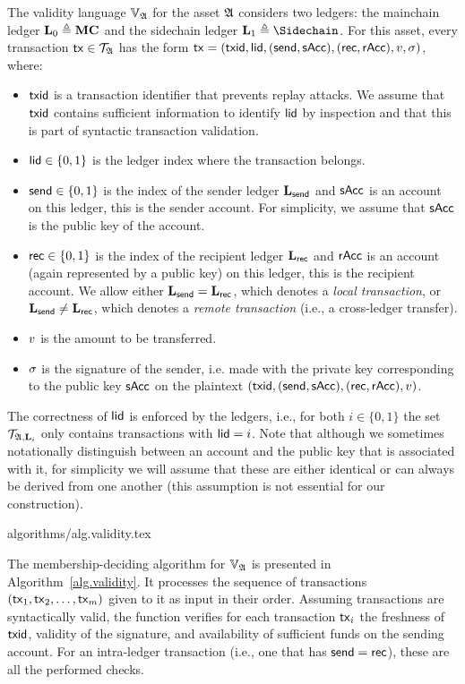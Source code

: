 The validity language $\mathbb{V}_{\mathfrak{A}}$ for the asset $\mathfrak{A}$ considers
two ledgers: the mainchain ledger $\mathbf{L}_0\triangleq\mathbf{MC}$ and the sidechain ledger
$\Ledger_1\defeq\Sidechain$. For this asset, every transaction $\mathsf{tx}\in\mathcal{T}_{\mathfrak{A}}$ has the form
$
\mathsf{tx}=\left(
  \mathsf{txid},
  \mathsf{lid},
  (\mathsf{send}, \mathsf{sAcc}),
  (\mathsf{rec}, \mathsf{rAcc}),
  v,
  \sigma
\right)
$,
where:
\begin{itemize}
  \item $\mathsf{txid}$ is a transaction identifier that prevents replay attacks.
    We assume that
    $\mathsf{txid}$ contains sufficient information to identify $\mathsf{lid}$ by inspection
    and that this is part of syntactic transaction validation.
  \item $\mathsf{lid} \in \{0, 1\}$ is the ledger index where the transaction belongs.
  \item $\mathsf{send} \in \{0, 1\}$ is the index of the sender ledger $\mathbf{L}_{\mathsf{send}}$ and
    $\mathsf{sAcc}$ is an account  on this ledger,
    this is the sender account. For simplicity, we assume that $\mathsf{sAcc}$ is
    the public key of the account.
  \item $\mathsf{rec} \in \{0, 1\}$ is the index of the recipient ledger $\mathbf{L}_{\mathsf{rec}}$ and
    $\mathsf{rAcc}$ is an account (again represented by a public key) on this
    ledger, this is the recipient account.
    We allow either $\mathbf{L}_{\mathsf{send}}=\mathbf{L}_{\mathsf{rec}}$, which denotes a \emph{local
    transaction}, or $\mathbf{L}_{\mathsf{send}}\neq\mathbf{L}_{\mathsf{rec}}$, which denotes a
    \emph{remote transaction} (i.e., a cross-ledger transfer).
\item $v$ is the amount to be transferred.
\item $\sigma$ is the signature of the sender, i.e. made with the private key
      corresponding to the public key $\mathsf{sAcc}$ on the plaintext
      $(\mathsf{txid}, (\mathsf{send}, \mathsf{sAcc}), (\mathsf{rec}, \mathsf{rAcc}), v)$.
\end{itemize}
The correctness of $\mathsf{lid}$ is enforced by the ledgers, i.e., for
both $i\in\{0,1\}$ the set $\mathcal{T}_{\mathfrak{A},\mathbf{L}_i}$ only contains transactions
with $\mathsf{lid}=i$.
Note that although we sometimes notationally distinguish between an account and the
public key that is associated with it, for simplicity we will assume that these
are either identical or can always be derived from one another (this assumption is not
essential for our construction).

{algorithms/alg.validity.tex}

The membership-deciding algorithm for $\mathbb{V}_{\mathfrak{A}}$
is presented in Algorithm~\ref{alg.validity}.
It
processes the sequence of transactions $(\mathsf{tx}_1, \mathsf{tx}_2, \dots,
\mathsf{tx}_m)$ given to it as input in their order. Assuming transactions are
syntactically valid, the function verifies for each transaction $\mathsf{tx}_i$ the
freshness of $\mathsf{txid}$, validity of the signature, and availability of sufficient
funds on the sending account. For an intra-ledger transaction (i.e., one that
has $\mathsf{send}=\mathsf{rec}$), these are all the performed checks.

